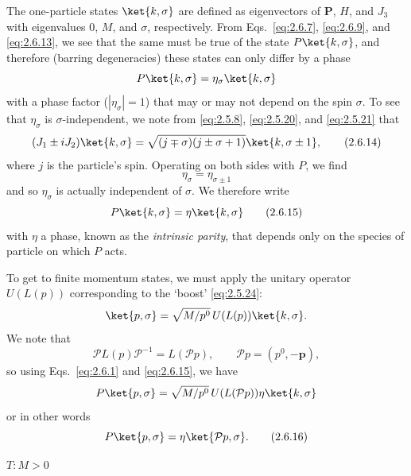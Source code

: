 The one-particle states $\ket{k,\sigma}$ are defined as eigenvectors of
$\mathbf{P}$, $H$, and $J_3$ with eigenvalues $0$, $M$, and $\sigma$,
respectively. From Eqs.~\eqref{eq:2.6.7}, \eqref{eq:2.6.9}, and \eqref{eq:2.6.13}, we see that the same
must be true of the state $P\ket{k,\sigma}$, and therefore (barring
degeneracies) these states can only differ by a phase
\[
P\ket{k,\sigma}=\eta_\sigma\ket{k,\sigma}
\]
with a phase factor ($|\eta_\sigma|=1$) that may or may not depend on the spin
$\sigma$. To see that $\eta_\sigma$ is $\sigma$-independent, we note from
\eqref{eq:2.5.8}, \eqref{eq:2.5.20}, and \eqref{eq:2.5.21} that
\begin{equation}
(J_1\mathbin{\pm}iJ_2)\ket{k,\sigma}
=\sqrt{(j\mp\sigma)(j\pm\sigma+1)}\ket{k,\sigma\mathbin{\pm}1},
\tag{2.6.14}\label{eq:2.6.14}
\end{equation}
where $j$ is the particle's spin. Operating on both sides with $P$, we find
\[
\eta_\sigma=\eta_{\sigma\pm1}
\]
and so $\eta_\sigma$ is actually independent of $\sigma$. We therefore write
\begin{equation}
P\ket{k,\sigma}=\eta\ket{k,\sigma}
\tag{2.6.15}\label{eq:2.6.15}
\end{equation}
with $\eta$ a phase, known as the \emph{intrinsic parity}, that depends only
on the species of particle on which $P$ acts.

To get to finite momentum states, we must apply the unitary operator
$U(L(p))$ corresponding to the `boost' \eqref{eq:2.5.24}:
\[
\ket{p,\sigma}=\sqrt{M/p^0}\,U(L(p))\ket{k,\sigma}.
\]
We note that
\[
\mathcal{P}L(p)\mathcal{P}^{-1}=L(\mathcal{P}p),
\qquad
\mathcal{P}p=(p^0,-\mathbf{p}),
\]
so using Eqs.~\eqref{eq:2.6.1} and \eqref{eq:2.6.15}, we have
\[
P\ket{p,\sigma}
=\sqrt{M/p^0}\,U(L(\mathcal{P}p))\eta\ket{k,\sigma}
\]
or in other words
\begin{equation}
P\ket{p,\sigma}=\eta\ket{\mathcal{P}p,\sigma}.
\tag{2.6.16}\label{eq:2.6.16}
\end{equation}

\medskip
\noindent\textbf{$T:M>0$}


